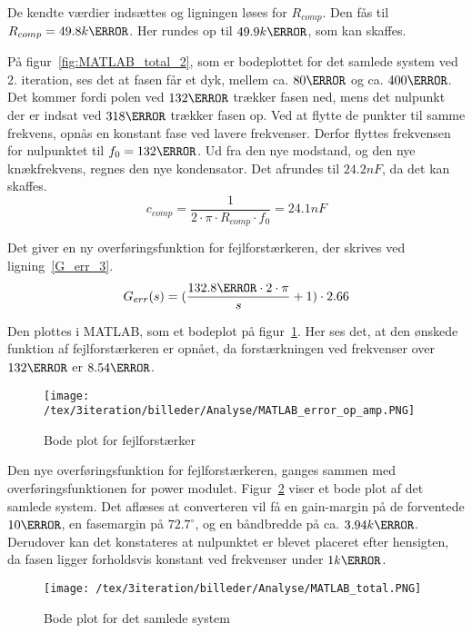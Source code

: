 \noindent De kendte værdier indsættes og ligningen løses for $R_{comp}$. Den fås til $R_{comp} = 49.8k\ohm$. Her rundes op til $49.9k\ohm$, som kan skaffes.

På figur~\ref{fig:MATLAB_total_2}, som er bodeplottet for det samlede system ved 2. iteration, ses det at fasen får et dyk, mellem ca. $80\hertz$ og ca. $400\hertz$. Det kommer fordi polen ved $132\hertz$ trækker fasen ned, mens det nulpunkt der er indsat ved $318\hertz$ trækker fasen op. Ved at flytte de punkter til samme frekvens, opnås en konstant fase ved lavere frekvenser. Derfor flyttes frekvensen for nulpunktet til $f_0=132\hertz$. Ud fra den nye modstand, og den nye knækfrekvens, regnes den nye kondensator. Det afrundes til $24.2nF$, da det kan skaffes.
\begin{equation} \label{c_comp_3}
c_{comp} = \frac{1}{2\cdot \pi \cdot R_{comp} \cdot f_0} = 24.1nF
\end{equation}

\noindent Det giver en ny overføringsfunktion for fejlforstærkeren, der skrives ved ligning~\ref{G_err_3}. 
\begin{equation} \label{G_err_3}
G_{err}(s) = (\frac{132.8\hertz \cdot 2\cdot\pi}{s} + 1) \cdot 2.66
\end{equation}

\noindent Den plottes i MATLAB, som et bodeplot på figur~\ref{fig:MATLAB_error_op_amp_3}. Her ses det, at den ønskede funktion af fejlforstærkeren er opnået, da forstærkningen ved frekvenser over $132\hertz$ er $8.54\decibel$. 

\begin{figure}[H]
	\center
	\texttt{[image: /tex/3iteration/billeder/Analyse/MATLAB\_error\_op\_amp.PNG]}
	\caption{Bode plot for fejlforstærker}
	\label{fig:MATLAB_error_op_amp_3}
\end{figure}

\noindent Den nye overføringsfunktion for fejlforstærkeren, ganges sammen med overføringsfunktionen for power modulet. Figur~\ref{fig:MATLAB_total_3} viser et bode plot af det samlede system. Det aflæses at converteren vil få en gain-margin på de forventede $10\decibel$, en fasemargin på $72.7^\circ$, og en båndbredde på ca. $3.94k\hertz$. Derudover kan det konstateres at nulpunktet er blevet placeret efter hensigten, da fasen ligger forholdsvis konstant ved frekvenser under $1k\hertz$. 

\begin{figure}[H]
	\center
	\texttt{[image: /tex/3iteration/billeder/Analyse/MATLAB\_total.PNG]}
	\caption{Bode plot for det samlede system}
	\label{fig:MATLAB_total_3}
\end{figure}






